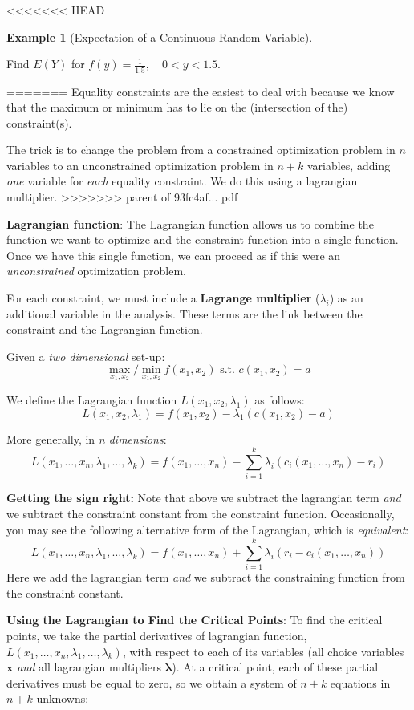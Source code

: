 \documentclass[]{book}
\theoremstyle{definition}
\theoremstyle{definition}
\newtheorem{example}{Example}[chapter]
\theoremstyle{definition}
\theoremstyle{remark}
\begin{document}
<<<<<<< HEAD
\begin{example}[Expectation of a Continuous Random Variable]
\protect\hypertarget{exm:expectconti}{}{\label{exm:expectconti} {} }

Find \(E(Y)\) for \(f(y)=\frac{1}{1.5}, \quad 0<y<1.5\).
\end{example}
=======
Equality constraints are the easiest to deal with because we know that the maximum or minimum has to lie on the (intersection of the) constraint(s).

The trick is to change the problem from a constrained optimization problem in \(n\) variables to an unconstrained optimization problem in \(n + k\) variables, adding \emph{one} variable for \emph{each} equality constraint. We do this using a lagrangian multiplier.
>>>>>>> parent of 93fc4af... pdf

\textbf{Lagrangian function}: The Lagrangian function allows us to combine the function we want to optimize and the constraint function into a single function. Once we have this single function, we can proceed as if this were an \emph{unconstrained} optimization problem.

For each constraint, we must include a \textbf{Lagrange multiplier} (\(\lambda_i\)) as an additional variable in the analysis. These terms are the link between the constraint and the Lagrangian function.

Given a \emph{two dimensional} set-up:
\[\max_{x_1,x_2}/\min_{x_1,x_2} f(x_1,x_2) \text{ s.t. } c(x_1,x_2) = a\]

We define the Lagrangian function \(L(x_1,x_2,\lambda_1)\) as follows:
\[L(x_1,x_2,\lambda_1) = f(x_1,x_2) - \lambda_1 (c(x_1,x_2) - a)\]

More generally, in \emph{n dimensions}:
\[ L(x_1, \dots, x_n, \lambda_1, \dots, \lambda_k) = f(x_1, \dots, x_n) - \sum_{i=1}^k\lambda_i(c_i(x_1,\dots, x_n) - r_i)\]

\textbf{Getting the sign right:} Note that above we subtract the lagrangian term \emph{and} we subtract the constraint constant from the constraint function. Occasionally, you may see the following alternative form of the Lagrangian, which is \emph{equivalent}:
\[ L(x_1, \dots, x_n, \lambda_1, \dots, \lambda_k) = f(x_1, \dots, x_n) + \sum_{i=1}^k\lambda_i(r_i - c_i(x_1,\dots, x_n))\]
Here we add the lagrangian term \emph{and} we subtract the constraining function from the constraint constant.

\textbf{Using the Lagrangian to Find the Critical Points}: To find the critical points, we take the partial derivatives of lagrangian function, \(L(x_1, \dots, x_n, \lambda_1, \dots, \lambda_k)\), with respect to each of its variables (all choice variables \(\mathbf{x}\) \emph{and} all lagrangian multipliers \(\mathbf{\lambda}\)). At a critical point, each of these partial derivatives must be equal to zero, so we obtain a system of \(n + k\) equations in \(n + k\) unknowns:
\end{document}
